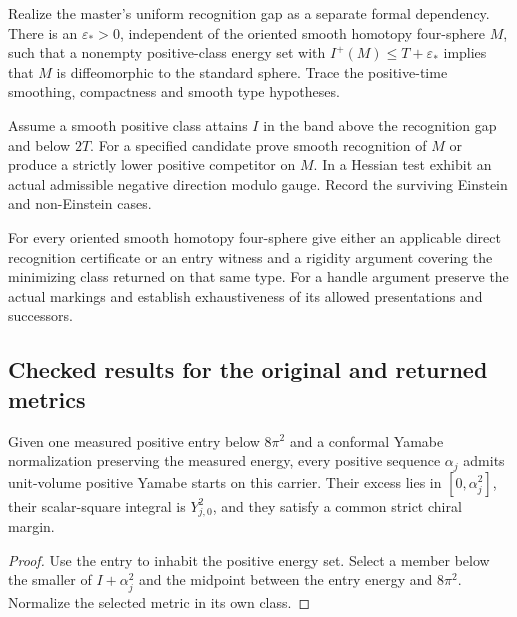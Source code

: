 \begin{openproblem}
\label{prop:ed05-uniform-gap}
Realize the master's uniform recognition gap as a separate formal
dependency. There is an $\varepsilon_*>0$, independent of the
oriented smooth homotopy four-sphere $M$, such that a nonempty
positive-class energy set with $I^+(M)\le T+\varepsilon_*$ implies
that $M$ is diffeomorphic to the standard sphere. Trace the
positive-time smoothing, compactness and smooth type hypotheses.
\end{openproblem}

\begin{openproblem}
\label{prop:ed05-rigidity}
Assume a smooth positive class attains $I$ in the band above the
recognition gap and below $2T$. For a specified candidate prove smooth
recognition of $M$ or produce a strictly lower positive competitor on
$M$. In a Hessian test exhibit an actual admissible negative direction
modulo gauge. Record the surviving Einstein and non-Einstein cases.
\end{openproblem}

\begin{openproblem}
\label{thm:ed05-coverage}
For every oriented smooth homotopy four-sphere give either an applicable
direct recognition certificate or an entry witness and a rigidity
argument covering the minimizing class returned on that same type.
For a handle argument preserve the actual markings and establish
exhaustiveness of its allowed presentations and successors.
\end{openproblem}

\subsection{Checked results for the original and returned metrics}

\begin{proposition}
\label{prop:ed47-start}
\leanok
Given one measured positive entry below $8\pi^2$ and a conformal Yamabe
normalization preserving the measured energy, every positive sequence
$\alpha_j$ admits unit-volume positive Yamabe starts on this carrier.
Their excess lies in $[0,\alpha_j^2]$, their scalar-square integral is
$Y_{j,0}^2$, and they satisfy a common strict chiral margin.
\end{proposition}
\begin{proof}
\leanok
Use the entry to inhabit the positive energy set. Select a member below the
smaller of $I+\alpha_j^2$ and the midpoint between the entry energy and
$8\pi^2$. Normalize the selected metric in its own class.
\end{proof}

